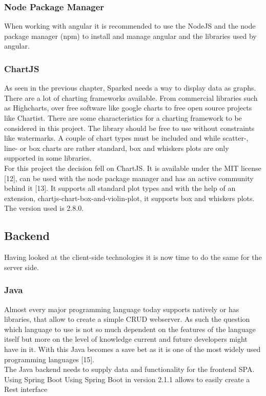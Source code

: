 \subsubsection{Node Package Manager}
When working with angular it is recommended to use the NodeJS and the node package manager (npm) to install and manage angular and the libraries used by angular.
\subsubsection{ChartJS}
As seen in the previous chapter, Sparked needs a way to display data as graphs. There are a lot of charting frameworks available. From commercial libraries such as Highcharts, over free software like google charts to free open source projects like Chartist. There are some characteristics for a charting framework to be considered in this project. The library should be free to use without constraints like watermarks. A couple of chart types must be included and while scatter-, line- or box charts are rather standard, box and whiskers plots are only supported in some libraries.\\ 
For this project the decision fell on ChartJS. It is available under the MIT license [12], can be used with the node package manager and has an active community behind it [13]. It supports all standard plot types and with the help of an extension, chartjs-chart-box-and-violin-plot, it supports box and whiskers plots. The version used is 2.8.0.
\subsection{Backend}
Having looked at the client-side technologies it is now time to do the same for the server side. 
\subsubsection{Java}
Almost every major programming language today supports natively or has libraries, that allow to create a simple CRUD webserver. As such the question which language to use is not so much dependent on the features of the language itself but more on the level of knowledge current and future developers might have in it. With this Java becomes a save bet as it is one of the most widely used programming languages [15]. \\
The Java backend needs to supply data and functionality for the frontend SPA. Using Spring Boot 
Using Spring Boot in version 2.1.1 allows to easily create a Rest interface
